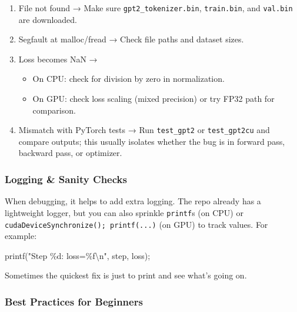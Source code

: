 \documentclass[
  letterpaper,
  DIV=11,
  numbers=noendperiod]{scrreprt}
\newenvironment{Shaded}{\begin{snugshade}}{\end{snugshade}}
\newcommand{\NormalTok}[1]{\textcolor[rgb]{0.00,0.23,0.31}{#1}}
\newcommand{\OperatorTok}[1]{\textcolor[rgb]{0.37,0.37,0.37}{#1}}
\newcommand{\SpecialCharTok}[1]{\textcolor[rgb]{0.37,0.37,0.37}{#1}}
\newcommand{\StringTok}[1]{\textcolor[rgb]{0.13,0.47,0.30}{#1}}
\providecommand{\tightlist}{%
  \setlength{\itemsep}{0pt}\setlength{\parskip}{0pt}}
\begin{document}
\begin{enumerate}
\def\labelenumi{\arabic{enumi}.}
\item
  File not found → Make sure \texttt{gpt2\_tokenizer.bin},
  \texttt{train.bin}, and \texttt{val.bin} are downloaded.
\item
  Segfault at malloc/fread → Check file paths and dataset sizes.
\item
  Loss becomes NaN →

  \begin{itemize}
  \tightlist
  \item
    On CPU: check for division by zero in normalization.
  \item
    On GPU: check loss scaling (mixed precision) or try FP32 path for
    comparison.
  \end{itemize}
\item
  Mismatch with PyTorch tests → Run \texttt{test\_gpt2} or
  \texttt{test\_gpt2cu} and compare outputs; this usually isolates
  whether the bug is in forward pass, backward pass, or optimizer.
\end{enumerate}

\subsubsection{Logging \& Sanity Checks}\label{logging-sanity-checks}

When debugging, it helps to add extra logging. The repo already has a
lightweight logger, but you can also sprinkle \texttt{printf}s (on CPU)
or \texttt{cudaDeviceSynchronize();\ printf(...)} (on GPU) to track
values. For example:

\begin{Shaded}
\begin{Highlighting}[]
\NormalTok{printf}\OperatorTok{(}\StringTok{"Step }\SpecialCharTok{\%d}\StringTok{: loss=}\SpecialCharTok{\%f\textbackslash{}n}\StringTok{"}\OperatorTok{,}\NormalTok{ step}\OperatorTok{,}\NormalTok{ loss}\OperatorTok{);}
\end{Highlighting}
\end{Shaded}

Sometimes the quickest fix is just to print and see what's going on.

\subsubsection{Best Practices for
Beginners}\label{best-practices-for-beginners}
\end{document}
